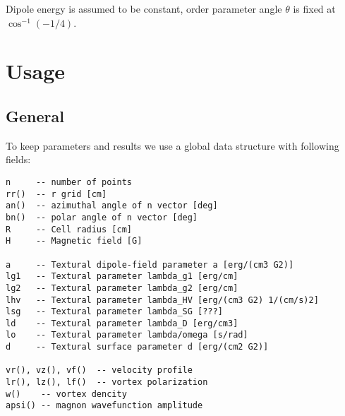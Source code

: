 \documentclass[a4paper]{article}
\begin{document}
Dipole energy is assumed to be constant, order parameter angle $\theta$
is fixed at $\cos^{-1}(-1/4)$.

\eject
\section*{Usage}

\subsection*{General}
To keep parameters and results we use a global data structure with following fields:

\begin{verbatim}
n     -- number of points
rr()  -- r grid [cm]
an()  -- azimuthal angle of n vector [deg]
bn()  -- polar angle of n vector [deg]
R     -- Cell radius [cm]
H     -- Magnetic field [G]

a     -- Textural dipole-field parameter a [erg/(cm3 G2)]
lg1   -- Textural parameter lambda_g1 [erg/cm]
lg2   -- Textural parameter lambda_g2 [erg/cm]
lhv   -- Textural parameter lambda_HV [erg/(cm3 G2) 1/(cm/s)2]
lsg   -- Textural parameter lambda_SG [???]
ld    -- Textural parameter lambda_D [erg/cm3]
lo    -- Textural parameter lambda/omega [s/rad]
d     -- Textural surface parameter d [erg/(cm2 G2)]

vr(), vz(), vf()  -- velocity profile
lr(), lz(), lf()  -- vortex polarization
w()    -- vortex dencity
apsi() -- magnon wavefunction amplitude
\end{verbatim}
\end{document}
